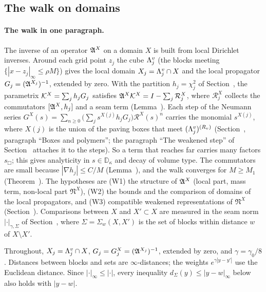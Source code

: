 \subsection{The walk on domains}\label{d9:walk}

\paragraph{The walk in one paragraph.} The inverse of an operator $\mathfrak A^X$ on a domain $X$ is built from local Dirichlet inverses. Around each grid point $z_j$ the cube $\Lambda^v_j$ (the blocks meeting $\{|x-z_j|_\infty\le\rho M\}$) gives the local domain $X_j=\Lambda^v_j\cap X$ and the local propagator $G_j=(\mathfrak A^{X_j})^{-1}$, extended by zero. With the partition $h_j=\chi_j^2$ of Section~, the parametrix $\mathcal K^X=\sum_jh_jG_j$ satisfies $\mathfrak A^X\mathcal K^X=I-\sum_j\mathcal R^X_j$, where $\mathcal R^X_j$ collects the commutators $[\mathfrak A^X,h_j]$ and a seam term (Lemma~). Each step of the Neumann series $G^X(s)=\sum_{n\ge0}\big(\sum_js^{X(j)}h_jG_j\big)\mathcal R^X(s)^n$ carries the monomial $s^{X(j)}$, where $X(j)$ is the union of the paving boxes that meet $(\Lambda^v_j)^{(R_v)}$ (Section~, paragraph ``Boxes and polymers''; the paragraph ``The weakened step'' of Section~ attaches it to the steps). So a term that reaches far carries many factors $s_\Box$; this gives analyticity in $s\in\mathbb D_\kappa$ and decay of volume type. The commutators are small because $|\nabla h_j|\le C/M$ (Lemma~), and the walk converges for $M\ge M_1$ (Theorem~). The hypotheses are (W1) the structure of $\mathfrak A^X$ (local part, mass term, non-local part $\mathfrak N^X$), (W2) the bounds and the comparison of domains of the local propagators, and (W3) compatible weakened representations of $\mathfrak N^X$ (Section~). Comparisons between $X$ and $X'\subset X$ are measured in the seam norm $|\cdot|_{\gamma,\Sigma}$ of Section~, where $\Sigma=\Sigma_w(X,X')$ is the set of blocks within distance $w$ of $X\setminus X'$.

Throughout, $X_j=\Lambda^v_j\cap X$, $G_j=G^X_j=(\mathfrak A^{X_j})^{-1}$, extended by zero, and $\gamma=\gamma_0/8$. Distances between blocks and sets are $\infty$-distances; the weights $e^{\gamma|y-y'|}$ use the Euclidean distance. Since $|\cdot|_\infty\le|\cdot|$, every inequality $d_\Sigma(y)\le|y-w|_\infty$ below also holds with $|y-w|$.

